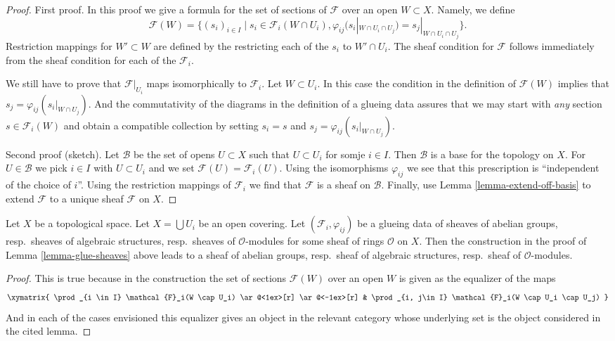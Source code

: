 \begin{proof}
First proof. In this proof we give a formula for the set of sections
of $\mathcal{F}$ over an open $W \subset X$. Namely, we define
$$
\mathcal{F}(W) =
\{
(s_i)_{i \in I} \mid
s_i \in \mathcal{F}_i(W \cap U_i),
\varphi_{ij}(s_i|_{W \cap U_i \cap U_j}) = s_j|_{W \cap U_i \cap U_j}
\}.
$$
Restriction mappings for $W' \subset W$ are defined by the restricting
each of the $s_i$ to $W' \cap U_i$. The sheaf condition for $\mathcal{F}$
follows immediately from the sheaf condition for each of the
$\mathcal{F}_i$.

\medskip\noindent
We still have to prove that $\mathcal{F}|_{U_i}$ maps
isomorphically to $\mathcal{F}_i$. Let $W \subset U_i$.
In this case the condition in the definition of
$\mathcal{F}(W)$ implies that $s_j = \varphi_{ij}(s_i|_{W \cap U_j})$.
And the commutativity of the diagrams in the definition
of a glueing data assures that we may start with {\it any}
section $s \in \mathcal{F}_i(W)$ and obtain a compatible
collection by setting $s_i = s$ and $s_j = \varphi_{ij}(s_i|_{W \cap U_j})$.

\medskip\noindent
Second proof (sketch). Let $\mathcal{B}$ be the set of opens $U \subset X$
such that $U \subset U_i$ for somje $i \in I$. Then $\mathcal{B}$
is a base for the topology on $X$. For $U \in \mathcal{B}$ we pick
$i \in I$ with $U \subset U_i$ and we set $\mathcal{F}(U) = \mathcal{F}_i(U)$.
Using the isomorphisms $\varphi_{ij}$ we see that this prescription
is ``independent of the choice of $i$''. Using the restriction mappings
of $\mathcal{F}_i$ we find that $\mathcal{F}$ is a sheaf on $\mathcal{B}$.
Finally, use Lemma \ref{lemma-extend-off-basis} to extend $\mathcal{F}$
to a unique sheaf $\mathcal{F}$ on $X$.
\end{proof}

\begin{lemma}
\label{lemma-glue-sheaves-structures}
Let $X$ be a topological space.
Let $X = \bigcup U_i$ be an open covering.
Let $(\mathcal{F}_i, \varphi_{ij})$ be a glueing data
of sheaves of abelian groups, resp.\ sheaves of algebraic structures,
resp.\ sheaves of $\mathcal{O}$-modules for some sheaf of rings
$\mathcal{O}$ on $X$. Then the construction in the proof of
Lemma \ref{lemma-glue-sheaves} above leads to a sheaf
of abelian groups, resp.\ sheaf of algebraic structures,
resp.\ sheaf of $\mathcal{O}$-modules.
\end{lemma}

\begin{proof}
This is true because in the construction the set of sections
$\mathcal{F}(W)$ over an open $W$ is given as the
equalizer of the maps
$$
\xymatrix{
\prod_{i \in I} \mathcal{F}_i(W \cap U_i)
\ar@<1ex>[r]
\ar@<-1ex>[r]
&
\prod_{i, j\in I} \mathcal{F}_i(W \cap U_i \cap U_j)
}
$$
And in each of the cases envisioned this equalizer gives
an object in the relevant category whose underlying set is
the object considered in the cited lemma.
\end{proof}

